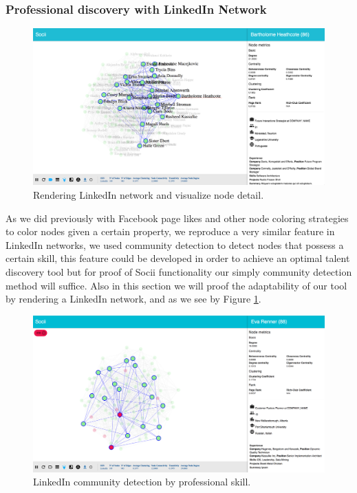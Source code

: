 \subsubsection{Professional discovery with LinkedIn Network}

\begin{figure}[h!]
\begin{center}
  \hspace*{-0.8in}
  \includegraphics[width=1.2\textwidth]{img/socii/socii_15.png}
\end{center}
\caption{\label{img:socii_15} Rendering LinkedIn network and visualize node detail.}
\end{figure}

As we did previously with Facebook page likes and other node coloring strategies to color nodes given a certain property, we reproduce a very similar feature in LinkedIn networks, we used community detection to detect nodes that possess a certain skill, this feature could be developed in order to achieve an optimal talent discovery tool but for proof of Socii functionality our simply community detection method will suffice. Also in this section we will proof the adaptability of our tool by rendering a LinkedIn network, and as we see by Figure \ref{img:socii_15}.\\

\begin{figure}[h!]
\begin{center}
  \hspace*{-0.8in}
  \includegraphics[width=1.2\textwidth]{img/socii/socii_16.png}
\end{center}
\caption{\label{img:socii_16} LinkedIn community detection by professional skill.}
\end{figure}

